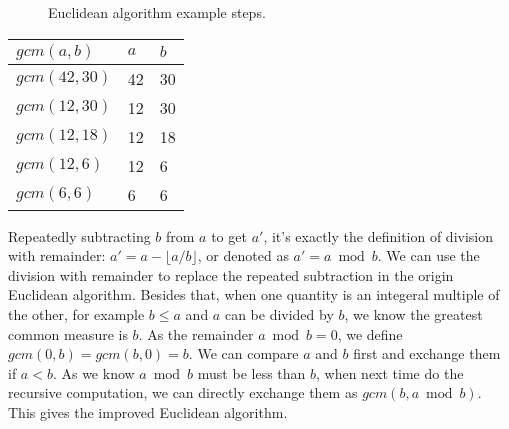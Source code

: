 \documentclass{article}
\begin{document}
\begin{figure}[htbp]
\centering
{}
\caption{Euclidean algorithm example steps.}
\label{fig:line-seg-gcm}
\end{figure}

\begin{tabular}{|l|l|l|}
\hline
$gcm(a, b)$ & $a$ & $b$ \\
\hline
$gcm(42, 30)$ & 42 & 30 \\
\hline
$gcm(12, 30)$ & 12 & 30 \\
\hline
$gcm(12, 18)$ & 12 & 18 \\
\hline
$gcm(12, 6)$ & 12 & 6 \\
\hline
$gcm(6, 6)$ & 6 & 6 \\
\hline
\end{tabular}

Repeatedly subtracting $b$ from $a$ to get $a'$, it's exactly the definition of division with remainder: $a' = a - \lfloor a / b \rfloor$, or denoted as $a'= a \bmod b$. We can use the division with remainder to replace the repeated subtraction in the origin Euclidean algorithm. Besides that, when one quantity is an integeral multiple of the other, for example $b \leq a$ and $a$ can be divided by $b$, we know the greatest common measure is $b$. As the remainder $a \bmod b = 0$, we define $gcm(0, b) = gcm(b, 0) = b$. We can compare $a$ and $b$ first and exchange them if $a < b$. As we know $a \bmod b$ must be less than $b$, when next time do the recursive computation, we can directly exchange them as $gcm(b, a \bmod b)$. This gives the improved Euclidean algorithm.
\end{document}
